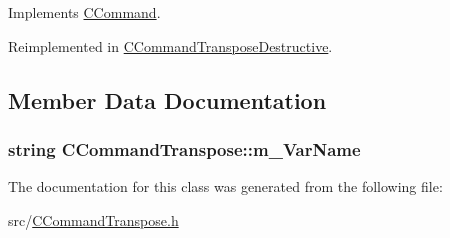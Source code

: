 Implements \hyperlink{classCCommand_ad9361ea814093c4ebecf22bb0a3f8b79}{C\+Command}.



Reimplemented in \hyperlink{classCCommandTransposeDestructive_ae71a2b525ece1435e335f0fe496d8e87}{C\+Command\+Transpose\+Destructive}.



\subsection{Member Data Documentation}
\subsubsection[{\texorpdfstring{m\+\_\+\+Var\+Name}{m_VarName}}]{\setlength{\rightskip}{0pt plus 5cm}string C\+Command\+Transpose\+::m\+\_\+\+Var\+Name\hspace{0.3cm}{\ttfamily [protected]}}\hypertarget{classCCommandTranspose_aa9eafd2768008a3f4585d65cbaa643b7}{}\label{classCCommandTranspose_aa9eafd2768008a3f4585d65cbaa643b7}


The documentation for this class was generated from the following file\+:\begin{DoxyCompactItemize}
\item 
src/\hyperlink{CCommandTranspose_8h}{C\+Command\+Transpose.\+h}\end{DoxyCompactItemize}

